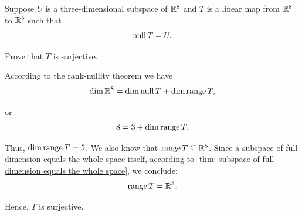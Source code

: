 \begin{xrcs}
  Suppose $U$ is a three-dimensional subspace of $\mathbb{R}^8$ and $T$ is a linear map from $\mathbb{R}^8$ to $\mathbb{R}^5$ such that
  \begin{equation}
    \operatorname{null} T = U.
  \end{equation}

  Prove that $T$ is surjective.

  \begin{xprf}
    According to the rank-nullity theorem we have
    \begin{equation}
        \dim \mathbb{R}^8 = \dim \operatorname{null} T + \dim \operatorname{range} T,
    \end{equation}

    or
    \begin{equation}
      8 = 3 + \dim \operatorname{range} T.
    \end{equation}

    Thus, $\dim \operatorname{range} T = 5$. We also know that $\operatorname{range} T \subseteq \mathbb{R}^5$. Since a subspace of full dimension equals the whole space itself, according to \ref{thm: subspace of full dimension equals the whole space}, we conclude:
    \begin{equation}
      \operatorname{range} T = \mathbb{R}^5.
    \end{equation}

    Hence, $T$ is surjective.
  \end{xprf}
\end{xrcs}

